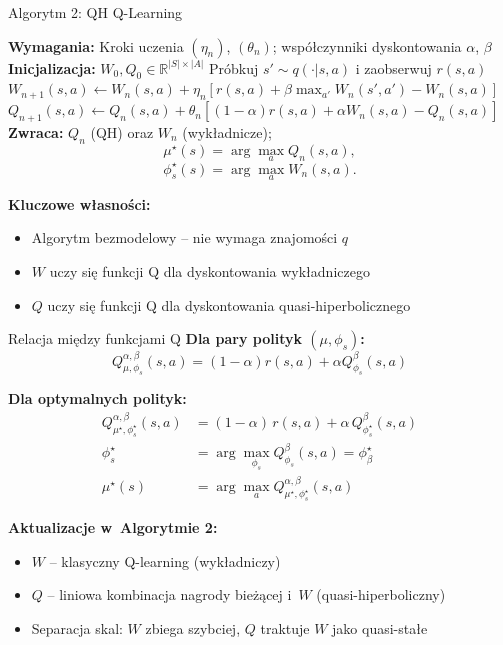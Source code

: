 \documentclass[aspectratio=169]{beamer}
\begin{document}
\begin{frame}{Algorytm 2: QH Q-Learning}
\begin{algorithm}[H]
\caption{Znajdowanie optymalnej polityki dla dyskontowania quasi-hiperbolicznego \cite{eshwar2025}}
\label{alg:qh-qlearning-defense}
\begin{algorithmic}[1]
\small
\STATE \textbf{Wymagania:} Kroki uczenia $(\eta_n)$, $(\theta_n)$; współczynniki dyskontowania $\alpha$, $\beta$
\STATE \textbf{Inicjalizacja:} $W_0, Q_0 \in \mathbb{R}^{|S| \times |A|}$
\STATE Próbkuj $s' \sim q(\cdot|s, a)$ i zaobserwuj $r(s, a)$
\STATE $W_{n+1}(s, a) \leftarrow W_n(s, a) + \eta_n \left[ r(s, a) + \beta \max_{a'} W_n(s', a') - W_n(s, a) \right]$
\STATE $Q_{n+1}(s, a) \leftarrow Q_n(s, a) + \theta_n \left[ (1 - \alpha) r(s, a) + \alpha W_n(s, a) - Q_n(s, a) \right]$
\ENDFOR
\ENDFOR
\STATE \textbf{Zwraca:} $Q_n$ (QH) oraz $W_n$ (wykładnicze);
\[ \mu^\star(s) = \arg\max\limits_a Q_n(s, a), \]
\[ \phi_s^\star(s) = \arg\max\limits_a W_n(s, a). \]
\end{algorithmic}
\end{algorithm}

\vspace{0.3em}
\textbf{Kluczowe własności:}
\begin{itemize}
    \item Algorytm bezmodelowy -- nie wymaga znajomości $q$
    \item $W$ uczy się funkcji Q dla dyskontowania wykładniczego
    \item $Q$ uczy się funkcji Q dla dyskontowania quasi-hiperbolicznego
\end{itemize}
\end{frame}

\begin{frame}{Relacja między funkcjami Q}
\textbf{Dla pary polityk $(\mu, \phi_s)$:}
\[
Q^{\alpha, \beta}_{\mu, \phi_s}(s,a) = (1-\alpha) r(s,a) + \alpha Q^{\beta}_{\phi_s}(s,a)
\]

\vspace{0.5em}
\textbf{Dla optymalnych polityk:}
\begin{align*}
Q^{\alpha,\beta}_{\mu^\star,\phi_s^\star}(s,a) &= (1-\alpha)\,r(s,a) + \alpha\,Q^{\beta}_{\phi_s^\star}(s,a) \\
\phi_s^\star &= \arg\max_{\phi_s} Q^{\beta}_{\phi_s}(s,a) = \phi_\beta^\star \\
\mu^\star(s) &= \arg\max_a Q^{\alpha, \beta}_{\mu^\star, \phi_s^\star}(s,a)
\end{align*}

\vspace{0.5em}
\textbf{Aktualizacje w~Algorytmie 2:}
\begin{itemize}
    \item $W$ -- klasyczny Q-learning (wykładniczy)
    \item $Q$ -- liniowa kombinacja nagrody bieżącej i~$W$ (quasi-hiperboliczny)
    \item Separacja skal: $W$ zbiega szybciej, $Q$ traktuje $W$ jako quasi-stałe
\end{itemize}
\end{frame}
\end{document}
